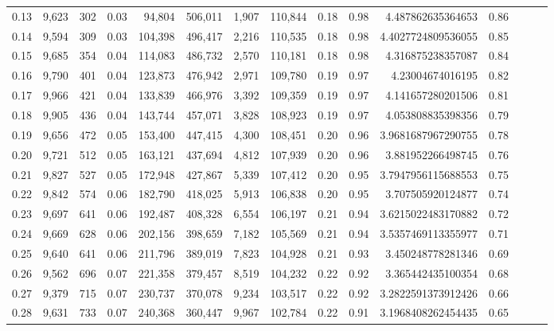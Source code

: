 \begin{tabular}{rrrrrrrrrrrrrrr}
0.13 &  9,623 &    302 &  0.03 &   94,804 &  506,011 &    1,907 &  110,844 &  0.18 &  0.98 &       4.487862635364653 &      0.86 \\
0.14 &  9,594 &    309 &  0.03 &  104,398 &  496,417 &    2,216 &  110,535 &  0.18 &  0.98 &      4.4027724809536055 &      0.85 \\
0.15 &  9,685 &    354 &  0.04 &  114,083 &  486,732 &    2,570 &  110,181 &  0.18 &  0.98 &       4.316875238357087 &      0.84 \\
0.16 &  9,790 &    401 &  0.04 &  123,873 &  476,942 &    2,971 &  109,780 &  0.19 &  0.97 &        4.23004674016195 &      0.82 \\
0.17 &  9,966 &    421 &  0.04 &  133,839 &  466,976 &    3,392 &  109,359 &  0.19 &  0.97 &       4.141657280201506 &      0.81 \\
0.18 &  9,905 &    436 &  0.04 &  143,744 &  457,071 &    3,828 &  108,923 &  0.19 &  0.97 &       4.053808835398356 &      0.79 \\
0.19 &  9,656 &    472 &  0.05 &  153,400 &  447,415 &    4,300 &  108,451 &  0.20 &  0.96 &      3.9681687967290755 &      0.78 \\
0.20 &  9,721 &    512 &  0.05 &  163,121 &  437,694 &    4,812 &  107,939 &  0.20 &  0.96 &       3.881952266498745 &      0.76 \\
0.21 &  9,827 &    527 &  0.05 &  172,948 &  427,867 &    5,339 &  107,412 &  0.20 &  0.95 &      3.7947956115688553 &      0.75 \\
0.22 &  9,842 &    574 &  0.06 &  182,790 &  418,025 &    5,913 &  106,838 &  0.20 &  0.95 &       3.707505920124877 &      0.74 \\
0.23 &  9,697 &    641 &  0.06 &  192,487 &  408,328 &    6,554 &  106,197 &  0.21 &  0.94 &      3.6215022483170882 &      0.72 \\
0.24 &  9,669 &    628 &  0.06 &  202,156 &  398,659 &    7,182 &  105,569 &  0.21 &  0.94 &      3.5357469113355977 &      0.71 \\
0.25 &  9,640 &    641 &  0.06 &  211,796 &  389,019 &    7,823 &  104,928 &  0.21 &  0.93 &       3.450248778281346 &      0.69 \\
0.26 &  9,562 &    696 &  0.07 &  221,358 &  379,457 &    8,519 &  104,232 &  0.22 &  0.92 &       3.365442435100354 &      0.68 \\
0.27 &  9,379 &    715 &  0.07 &  230,737 &  370,078 &    9,234 &  103,517 &  0.22 &  0.92 &      3.2822591373912426 &      0.66 \\
0.28 &  9,631 &    733 &  0.07 &  240,368 &  360,447 &    9,967 &  102,784 &  0.22 &  0.91 &      3.1968408262454435 &      0.65 \\

\end{tabular}
